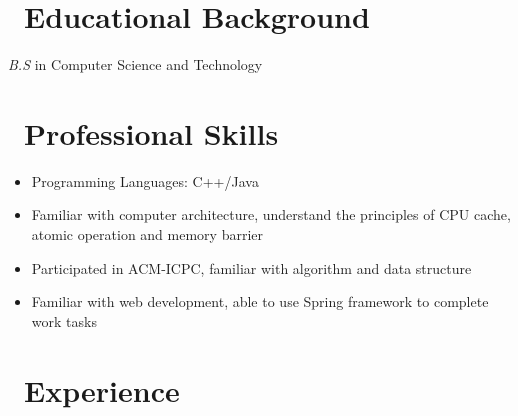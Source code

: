 \documentclass{resume}
\begin{document}



\section{\texorpdfstring{\faGraduationCap\ Educational Background}{Educational Background}}
\textit{B.S} in Computer Science and Technology

\section{\texorpdfstring{\faCogs\ Professional Skills}{Professional Skills}}
\begin{itemize}[parsep=0.5ex]
  \item Programming Languages: C++/Java
  \item Familiar with computer architecture, understand the principles of CPU cache, atomic operation and memory barrier
  \item Participated in ACM-ICPC, familiar with algorithm and data structure
  \item Familiar with web development, able to use Spring framework to complete work tasks
\end{itemize}

\section{\texorpdfstring{\faUsers\ Experience}{Experience}}
\end{document}
